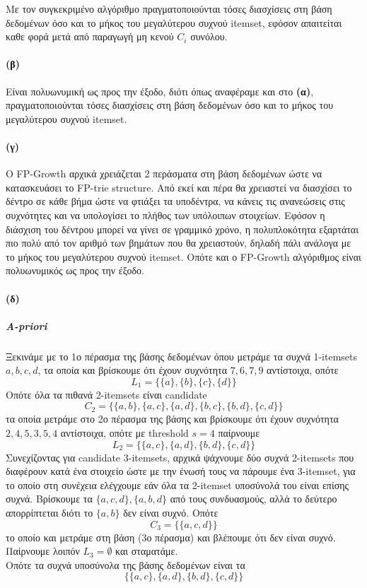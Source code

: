 \documentclass[a4paper,11pt]{article}
\begin{document}
Με τον συγκεκριμένο αλγόριθμο πραγματοποιούνται τόσες διασχίσεις στη βάση δεδομένων όσο και το μήκος του μεγαλύτερου συχνού itemset, εφόσον απαιτείται καθε φορά μετά από παραγωγή μη κενού $C_i$ συνόλου.

\paragraph{(β)} Είναι πολυωνυμική ως προς την έξοδο, διότι όπως αναφέραμε και στο \textbf{(α)}, πραγματοποιούνται τόσες διασχίσεις στη βάση δεδομένων όσο και το μήκος του μεγαλύτερου συχνού itemset.

\paragraph{(γ)} Ο FP-Growth αρχικά χρειάζεται 2 περάσματα στη βάση δεδομένων ώστε να κατασκευάσει το FP-trie structure.
Από εκεί και πέρα θα χρειαστεί να διασχίσει το δέντρο σε κάθε βήμα ώστε να φτιάξει τα υποδέντρα, να κάνεις τις ανανεώσεις στις συχνότητες και να υπολογίσει το πλήθος των υπόλοιπων στοιχείων.
Εφόσον η διάσχιση του δέντρου μπορεί να γίνει σε γραμμικό χρόνο, η πολυπλοκότητα εξαρτάται πιο πολύ από τον αριθμό των βημάτων που θα χρειαστούν, δηλαδή πάλι ανάλογα με το μήκος του μεγαλύτερου συχνού itemset.
Οπότε και ο FP-Growth αλγόριθμος είναι πολυωνυμικός ως προς την έξοδο.

\paragraph{(δ)}
\subparagraph{Α-priori}
Ξεκινάμε με το 1ο πέρασμα της βάσης δεδομένων όπου μετράμε τα συχνά 1-itemsets $a,b,c,d$, τα οποία και βρίσκουμε ότι έχουν συχνότητα $7,6,7,9$ αντίστοιχα, οπότε
\[ L_1 = \{ \{a\},\{b\},\{c\},\{d\} \} \]
Οπότε όλα τα πιθανά 2-itemsets είναι candidate
\[ C_2 = \{ \{a,b\},\{a,c\},\{a,d\},\{b,c\},\{b,d\},\{c,d\} \} \]
τα οποία μετράμε στο 2ο πέρασμα της βάσης και βρίσκουμε ότι έχουν συχνότητα $2,4,5,3,5,4$ αντίστοιχα, οπότε με threshold $s=4$ παίρνουμε
\[ L_2 = \{ \{a,c\},\{a,d\},\{b,d\},\{c,d\} \} \]
Συνεχίζοντας για candidate 3-itemsets, αρχικά ψάχνουμε δύο συχνά 2-itemsets που διαφέρουν κατά ένα στοιχείο ώστε με την ένωσή τους να πάρουμε ένα 3-itemset, για το οποίο στη συνέχεια ελέγχουμε εάν όλα τα 2-itemset υποσύνολά του είναι επίσης συχνά.
Βρίσκουμε τα $\{a,c,d\},\{a,b,d\}$ από τους συνδυασμούς, αλλά το δεύτερο απορρίπτεται διότι το $\{a,b\}$ δεν είναι συχνό.
Οπότε
\[ C_3 = \{ \{a,c,d\} \} \]
το οποίο και μετράμε στη βάση (3ο πέρασμα) και βλέπουμε ότι δεν είναι συχνό.
Παίρνουμε λοιπόν $L_3 = \emptyset$ και σταματάμε.
\\[8pt]
Οπότε τα συχνά υποσύνολα της βάσης δεδομένων είναι τα
\[ \{ \{a,c\},\{a,d\},\{b,d\},\{c,d\} \} \]
\end{document}
